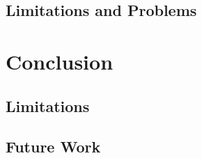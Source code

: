 \documentclass[cic,tc,english]{iiufrgs}
\begin{document}
\section{Limitations and Problems}


\chapter{Conclusion}

\section{Limitations}

\section{Future Work}





\end{document}
